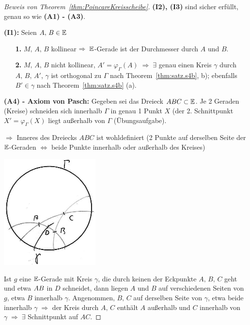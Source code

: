 \begin{proof}[Beweis von Theorem~\ref{thm:PoincareKreisscheibe}]
{\bf (I2), (I3)} sind sicher erfüllt, genau so wie {\bf (A1) - (A3)}. %

{\bf (I1):} Seien $A,\,B\in\mathbb E$
\begin{enumerate}
\item[{\bf 1.}] $M,\,A,\,B$ kollinear $\Rightarrow\;\mathbb E$-Gerade
ist der Durchmesser durch $A$ und $B$. \item[{\bf 2.}] $M,\,A,\,B$
nicht kollinear, $A'=\varphi_\Gamma(A)\;\Rightarrow\;\exists$ genau
einen Kreis $\gamma$ durch $A,\,B,\,A'$, $\gamma$ ist orthogonal zu
$\Gamma$ nach Theorem~\ref{thm:satz.s4b}, b); ebenfalls $B'\in \gamma$ nach
Theorem~\ref{thm:satz.s4b} (a).
\end{enumerate}




{\bf (A4) - Axiom von Pasch:} Gegeben sei das Dreieck
$ABC\subset\mathbb E$. Je 2 Geraden (Kreise) schneiden sich
innerhalb $\Gamma$ in genau 1 Punkt $X$ (der 2. Schnittpunkt
$X'=\varphi_\Gamma(X)$ liegt au{\ss}erhalb von $\Gamma$ (\"{U}bungsaufgabe).

$\Rightarrow$ Inneres des Dreiecks $ABC$ ist wohldefiniert (2 Punkte
auf derselben Seite der $\mathbb E$-Geraden $\Longleftrightarrow$ beide
Punkte innerhalb oder au{\ss}erhalb des Kreises)


\centerline{\includegraphics[width=5cm]{BILDER/4-2-08-Pasch.jpg}}



Ist $g$ eine $\mathbb E$-Gerade mit Kreis $\gamma$, die durch keinen der
Eckpunkte $A,\,B,\,C$ geht und etwa ${AB}$ in $D$ schneidet,
dann liegen $A$ und $B$ auf verschiedenen Seiten von $g$, etwa $B$
innerhalb $\gamma$. Angenommen, $B,\,C$ auf derselben Seite von
$\gamma$, etwa beide innerhalb $\gamma\;\Rightarrow$ der Kreis
durch $A,\,C$ enth\"{a}lt $A$ au{\ss}erhalb und $C$ innerhalb von
$\gamma\;\Rightarrow\;\exists$ Schnittpunkt auf $AC$.
\end{proof}







